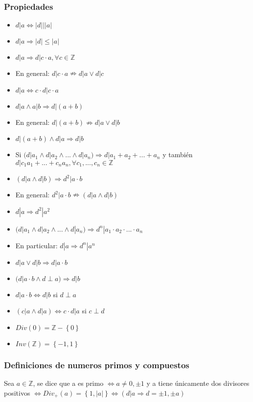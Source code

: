 \documentclass{article}
\begin{document}
\subsubsection{Propiedades}
\begin{itemize}
    \item $d|a \iff |d| | |a|$
    \item $d|a \Rightarrow |d| \leq |a|$
    \item $d|a \Rightarrow d|c \cdot a, \forall c \in \mathbb{Z}$
    \item En general: $d|c \cdot a \nRightarrow d|a \lor d|c$
    \item $d|a \iff c \cdot d | c \cdot a$
    \item $d|a \land a|b \Rightarrow d|(a+b)$
    \item En general: $d|(a+b) \nRightarrow d|a \lor d|b$
    \item $d|(a+b) \land d|a \Rightarrow d|b$
    \item Si $(d|a_1 \land d|a_2 \land ... \land d|a_n) \Rightarrow d|a_1 + a_2 + ... + a_n$ y también $d|c_1a_1 + ... + c_na_n, \forall c_1,...,c_n \in \mathbb{Z}$
    \item $(d|a \land d|b) \Rightarrow d^2|a \cdot b$
    \item En general: $d^2|a \cdot b \nRightarrow (d|a \land d|b)$
    \item $d|a \Rightarrow d^2|a^2$
    \item $(d|a_1 \land d|a_2 \land ... \land d|a_n) \Rightarrow d^n|a_1 \cdot a_2 \cdot ... \cdot a_n$
    \item En particular: $d|a \Rightarrow d^n | a^n$
    \item $d|a \lor d|b \Rightarrow d|a \cdot b$
    \item $(d| a \cdot b \land d \perp a) \Rightarrow d|b$
    \item $d|a \cdot b \iff d|b$ si $d \perp a$
    \item $(c|a \land d|a) \iff c \cdot d|a$ si $c \perp d$
    \item $Div (0) = \mathbb{Z}-\left\{0\right\}$
    \item $Inv (\mathbb{Z}) = \left\{-1,1\right\}$
\end{itemize}

\subsubsection{Definiciones de numeros primos y compuestos}
Sea $a \in \mathbb{Z}$, se dice que a es primo $\iff a \neq 0, \pm 1$ y a tiene únicamente dos divisores positivos $\iff Div_+ (a) = \left\{1, |a|\right\} \iff (d|a \Rightarrow d = \pm 1, \pm a)$
\end{document}
